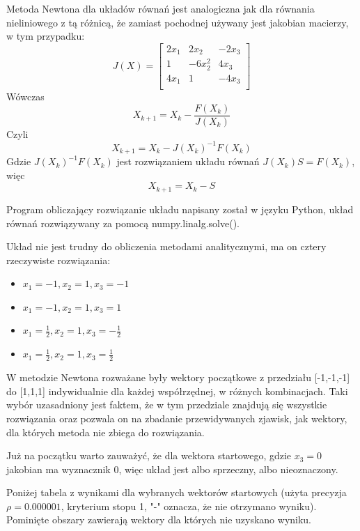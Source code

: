 \documentclass{article}
\begin{document}
Metoda Newtona dla układów równań jest analogiczna jak dla równania nieliniowego z tą różnicą, że zamiast pochodnej używany
jest jakobian macierzy, w tym przypadku:
$$J(X)=
\begin{bmatrix}
    2x_1 & 2x_2 & -2x_3 \\
    1 & -6x_2^2 & 4x_3 \\
    4x_1 & 1 & -4x_3 \\
\end{bmatrix}
$$
Wówczas
$$X_{k+1} = X_k - \frac{F(X_k)}{J(X_k)}$$
Czyli
$$X_{k+1} = X_k - J(X_k)^{-1}F(X_k)$$
Gdzie $J(X_k)^{-1}F(X_k)$ jest rozwiązaniem układu równań $J(X_k)S = F(X_k)$, więc
$$X_{k+1} = X_k - S$$

Program obliczający rozwiązanie układu napisany został w języku Python, układ równań rozwiązywany za pomocą numpy.linalg.solve().

Układ nie jest trudny do obliczenia metodami analitycznymi, ma on cztery rzeczywiste rozwiązania:
\begin{itemize}
    \item 
    $x_1= -1, x_2= 1, x_3= -1$
    \item 
    $x_1= -1, x_2= 1, x_3= 1$
    \item 
    $x_1= \frac{1}{2}, x_2= 1, x_3= -\frac{1}{2}$
    \item 
    $x_1= \frac{1}{2}, x_2= 1, x_3= \frac{1}{2}$
\end{itemize}

W metodzie Newtona rozważane były wektory początkowe z przedziału [-1,-1,-1] do [1,1,1] indywidualnie dla każdej współrzędnej, 
w różnych kombinacjach. Taki wybór uzasadniony jest faktem, że w tym przedziale znajdują się wszystkie rozwiązania oraz pozwala on
na zbadanie przewidywanych zjawisk, jak wektory, dla których metoda nie zbiega do rozwiązania.

Już na początku warto zauważyć, że dla wektora startowego, gdzie $x_3=0$ jakobian ma wyznacznik 0, więc układ jest albo sprzeczny, albo nieoznaczony.

Poniżej tabela z wynikami dla wybranych wektorów startowych (użyta precyzja $\rho=0.000001$, kryterium stopu 1,  "-" oznacza, że nie otrzymano wyniku).
Pominięte obszary zawierają wektory dla których nie uzyskano wyniku.
\end{document}
